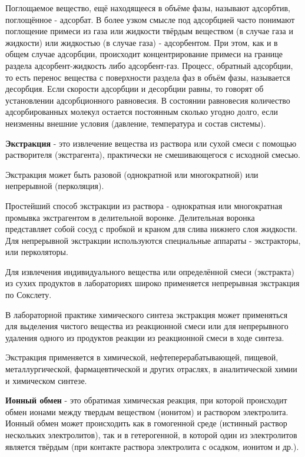 \documentclass[14pt,a4paper]{scrartcl}
\begin{document}
Поглощаемое вещество, ещё находящееся в объёме фазы, называют адсорбтив, поглощённое - адсорбат. В более узком смысле под адсорбцией часто понимают поглощение примеси из газа или жидкости твёрдым веществом (в случае газа и жидкости) или жидкостью (в случае газа) - адсорбентом. При этом, как и в общем случае адсорбции, происходит концентрирование примеси на границе раздела адсорбент-жидкость либо адсорбент-газ. Процесс, обратный адсорбции, то есть перенос вещества с поверхности раздела фаз в объём фазы, называется десорбция. Если скорости адсорбции и десорбции равны, то говорят об установлении адсорбционного равновесия. В состоянии равновесия количество адсорбированных молекул остается постоянным сколько угодно долго, если неизменны внешние условия (давление, температура и состав системы).

\textbf{Экстракция} - это извлечение вещества из раствора или сухой смеси с помощью растворителя (экстрагента), практически не смешивающегося с исходной смесью.

Экстракция может быть разовой (однократной или многократной) или непрерывной (перколяция).

Простейший способ экстракции из раствора - однократная или многократная промывка экстрагентом в делительной воронке. Делительная воронка представляет собой сосуд с пробкой и краном для слива нижнего слоя жидкости. Для непрерывной экстракции используются специальные аппараты - экстракторы, или перколяторы.

Для извлечения индивидуального вещества или определённой смеси (экстракта) из сухих продуктов в лабораториях широко применяется непрерывная экстракция по Сокслету.

В лабораторной практике химического синтеза экстракция может применяться для выделения чистого вещества из реакционной смеси или для непрерывного удаления одного из продуктов реакции из реакционной смеси в ходе синтеза.

Экстракция применяется в химической, нефтеперерабатывающей, пищевой, металлургической, фармацевтической и других отраслях, в аналитической химии и химическом синтезе.

\textbf{Ионный обмен} - это обратимая химическая реакция, при которой происходит обмен ионами между твердым веществом (ионитом) и раствором электролита. Ионный обмен может происходить как в гомогенной среде (истинный раствор нескольких электролитов), так и в гетерогенной, в которой один из электролитов является твёрдым (при контакте раствора электролита с осадком, ионитом и др.).
\end{document}
